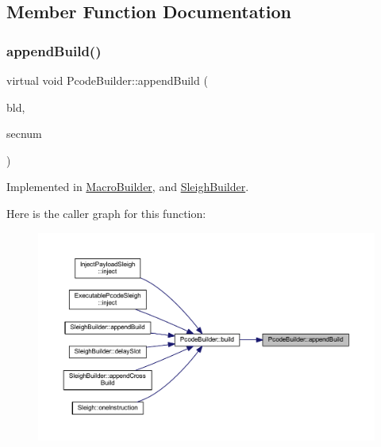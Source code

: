 \subsection{Member Function Documentation}
\mbox{\label{class_pcode_builder_aa5c50ed5c414075e71fee8d31a976608}} 
\subsubsection{\texorpdfstring{appendBuild()}{appendBuild()}}
{\footnotesize\ttfamily virtual void Pcode\+Builder\+::append\+Build (\begin{DoxyParamCaption}\item[{\mbox{\hyperlink{class_op_tpl}{Op\+Tpl}} $\ast$}]{bld,  }\item[{int4}]{secnum }\end{DoxyParamCaption})\hspace{0.3cm}{\ttfamily [pure virtual]}}



Implemented in \mbox{\hyperlink{class_macro_builder_a03bea914f6f63a779c6dd7c6d547c5d8}{Macro\+Builder}}, and \mbox{\hyperlink{class_sleigh_builder_a9e9d6b0de400f9aa14caf2732b7bfeef}{Sleigh\+Builder}}.

Here is the caller graph for this function\+:
\nopagebreak
\begin{figure}[H]
\begin{center}
\leavevmode
\includegraphics[width=350pt]{class_pcode_builder_aa5c50ed5c414075e71fee8d31a976608_icgraph}
\end{center}
\end{figure}
\mbox{\label{class_pcode_builder_ab8214b4b69aea45b459b1a37c1c2aa77}} 
